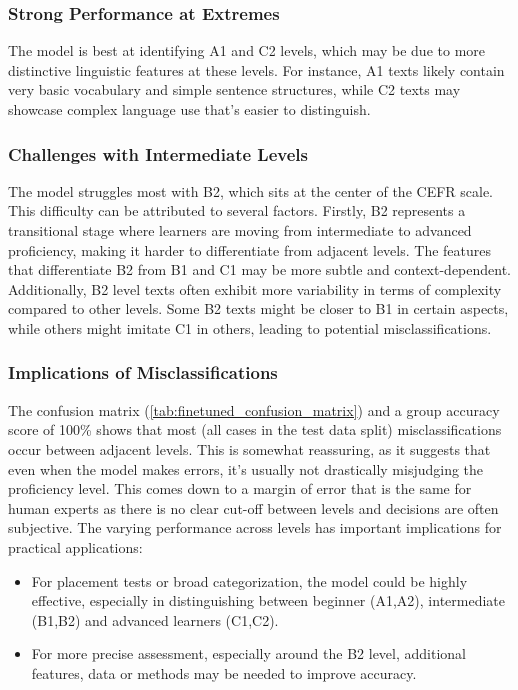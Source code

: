\subsubsection*{Strong Performance at Extremes}
\label{sss:strong_performance_at_extremes}
The model is best at identifying A1 and C2 levels, which may be due to more distinctive linguistic features at these levels. For instance, A1 texts likely contain very basic vocabulary and simple sentence structures, while C2 texts may showcase complex language use that's easier to distinguish.

\subsubsection*{Challenges with Intermediate Levels}
\label{sss:challenges_with_intermediate_levels}
The model struggles most with B2, which sits at the center of the CEFR scale. 
This difficulty can be attributed to several factors. Firstly, B2 represents a transitional stage where learners are moving from intermediate to advanced proficiency, making it harder to differentiate from adjacent levels. The features that differentiate B2 from B1 and C1 may be more subtle and context-dependent. Additionally, B2 level texts often exhibit more variability in terms of complexity compared to other levels. Some B2 texts might be closer to B1 in certain aspects, while others might imitate C1 in others, leading to potential misclassifications.

\subsubsection*{Implications of Misclassifications}
\label{sss:implications_of_misclassifications}
The confusion matrix (\ref{tab:finetuned_confusion_matrix}) and a group accuracy score of 100\% shows that most (all cases in the test data split) misclassifications occur between adjacent levels. This is somewhat reassuring, as it suggests that even when the model makes errors, it's usually not drastically misjudging the proficiency level. This comes down to a margin of error that is the same for human experts as there is no clear cut-off between levels and decisions are often subjective.
The varying performance across levels has important implications for practical applications:

\begin{itemize}
    \item For placement tests or broad categorization, the model could be highly effective, especially in distinguishing between beginner (A1,A2), intermediate (B1,B2) and advanced learners (C1,C2).
    \item For more precise assessment, especially around the B2 level, additional features, data or methods may be needed to improve accuracy.
\end{itemize}
